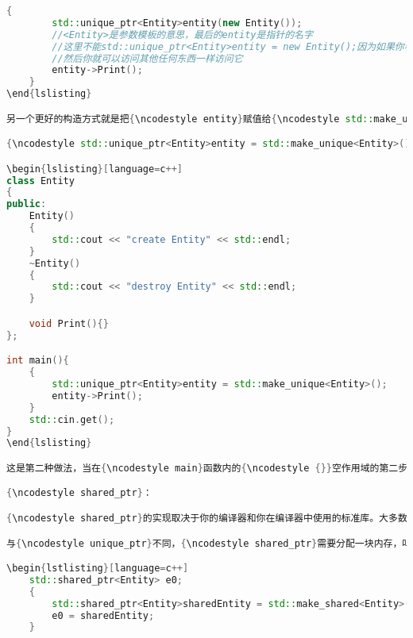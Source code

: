 \begin{lstlisting}[language=c++]
    {
        std::unique_ptr<Entity>entity(new Entity());
        //<Entity>是参数模板的意思，最后的entity是指针的名字
        //这里不能std::unique_ptr<Entity>entity = new Entity();因为如果你看unique_ptr，他的构造实际是explicit的，需要显式调用构造
        //然后你就可以访问其他任何东西一样访问它
        entity->Print();
    }
\end{lslisting}

另一个更好的构造方式就是把{\ncodestyle entity}赋值给{\ncodestyle std::make_unique}:

{\ncodestyle std::unique_ptr<Entity>entity = std::make_unique<Entity>();}这对于{\ncodestyle unique_ptr}很重要，主要原因是出于异常安全，通常是没问题的，但是当出现异常时，会稍微更加安全一些，您最终不会得到一个没有引用的悬空指针，从而造成内存泄漏。

\begin{lslisting}[language=c++]
class Entity
{
public:
    Entity()
    {
        std::cout << "create Entity" << std::endl;
    }
    ~Entity()
    {
        std::cout << "destroy Entity" << std::endl;
    }

    void Print(){}
};

int main(){
    {
        std::unique_ptr<Entity>entity = std::make_unique<Entity>();
        entity->Print();
    }
    std::cin.get();
}
\end{lslisting}

这是第二种做法，当在{\ncodestyle main}函数内的{\ncodestyle {}}空作用域的第二步打断点，然后{\ncodestyle F10}跳出作用域后，可看到析构函数被调用。作用域结束，这是最简单的智能指针，开销也很小甚至没有。只是一个栈分配对象，当栈分配对象死亡时，他就调用delete在你的指针上，并释放内存。正如所说，这个指针不能被复制与分享，你可以尝试{\ncodestyle std::unique_ptr<Entity> e0 = entity;}编译器报错。如果你进入{\ncodestyle unique_ptr}的定义，你会看到有些奇怪，拷贝构造函数和拷贝构造操作符实际上被删除了。这是专门用来防止你给自己挖坑的。

{\ncodestyle shared_ptr}：

{\ncodestyle shared_ptr}的实现取决于你的编译器和你在编译器中使用的标准库。大多数使用引用计数。引用计数基本上是一种方法可以，可以跟踪你的指针有多少引用，一旦引用数达到零他就被删除了。举个例子，我创建了一个{\ncodestyle shared_ptr}，然后创建了另一个{\ncodestyle shared_ptr}来复制他，我的引用数是{\ncodestyle 2}，第一个和第二个，当地一个死的时候，引用数减少{\ncodestyle 1}，另一个死的时候，引用数归零，我就死了，内存释放。

与{\ncodestyle unique_ptr}不同，{\ncodestyle shared_ptr}需要分配一块内存，叫控制块，用来存储计数，如果你首先创建一个{\ncodestyle new Entity}，然后将其传递给{\ncodestyle shared_ptr}，他必须做两次内存分配，然而你用{\ncodestyle make_shared}你就可以将两者结合起来，这样更有效率。请看如下代码：

\begin{lstlisting}[language=c++]
    std::shared_ptr<Entity> e0;
    {
        std::shared_ptr<Entity>sharedEntity = std::make_shared<Entity>();
        e0 = sharedEntity;
    }
\end{lstlisting}

